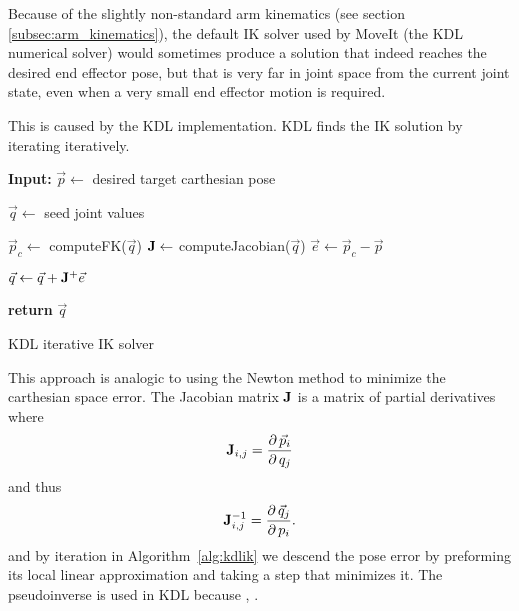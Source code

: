\documentclass[buriama8_dp.tex]{subfiles}
\begin{document}

Because of the slightly non-standard arm kinematics (see section \ref{subsec:arm_kinematics}), the default IK solver used by MoveIt (the KDL numerical solver) would sometimes produce a solution that indeed reaches the desired end effector pose, but that is very far in joint space from the current joint state, even when a very small end effector motion is required.

\begin{figure}[ht]
  \centering
  \label{fig:label}
  \caption{}
\end{figure}

This is caused by the KDL implementation. KDL finds the IK solution by iterating iteratively.

\begin{algorithm}[htp]
\begin{algorithmic}
  \State \textbf{Input:} \(\vec p \gets\) desired target carthesian pose
  \vspace{1em}

  \State \(\vec q \gets\) seed joint values
 
  \Do
    \State \(\vec p_c \gets\) computeFK(\(\vec q\))
    \State \(\mathbf{J} \gets\) computeJacobian(\(\vec q\))
    \State \(\vec e \gets \vec p_c - \vec p\)

    \State \(\vec q \gets \vec q + \mathbf{J}^+ \vec e \)

  \vspace{1em}
  \State \textbf{return} \(\vec q\)
\end{algorithmic}
\caption{KDL iterative IK solver}
\label{alg:kdlik}
\end{algorithm}

This approach is analogic to using the Newton method to minimize the carthesian space error. The Jacobian matrix \(\mathbf{J}\) is a matrix of partial derivatives where
\[
\mathbf{J}_{i,j} = \frac{\partial\,{\vec p_i}}{\partial\, q_j}
\]
and thus
\[
\mathbf{J}_{i,j}^{-1} = \frac{\partial\,{\vec q_j}}{\partial\, p_i}.
\]
and by iteration in Algorithm~\ref{alg:kdlik} we descend the pose error by preforming its local linear approximation and taking a step that minimizes it. The pseudoinverse is used in KDL because , .
\end{document}
